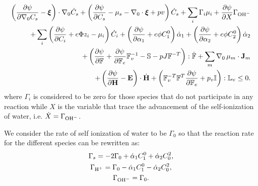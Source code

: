 \documentclass[12pt]{extarticle}
\newcommand{\F}{\ensuremath{\mathbb{F}}}
\begin{document}
\begin{equation*}
\begin{aligned}
\left(\frac{\partial \psi}{\partial \nabla_0 C_s}-\boldsymbol{\xi}\right) \cdot \nabla_0 \dot{C}_s + \left(\frac{\partial \psi}{\partial C_s}-\mu_s-\nabla_0 \cdot \boldsymbol{\xi}+p v\right)\dot{C}_s+ \sum_i \Gamma_i \mu_i + \frac{\partial \psi}{\partial X} \Gamma_{\ce{OH-}}\\
+ \sum_i\left(\frac{\partial \psi}{\partial C_i} + e\Phi z_i-\mu_i\right) \dot{C}_i + \left(\frac{\partial \psi}{\partial \alpha_1}+e\phi C^0_1\right)\dot{\alpha}_1 + \left(\frac{\partial \psi}{\partial \alpha_2}+e\phi C^0_2\right)\dot{\alpha}_2\\
+ \left(\frac{\partial \psi}{\partial \F} + \frac{\partial \psi}{\partial\F_e}\F_v^{-1}- \mathbb{S} - p J \F^{-T}\right): \dot{\F}+ \sum_m \nabla_0 \,\mu_m \cdot \mathbf{J}_m \\
+\left(\frac{\partial \psi}{\partial \mathbf{H}}-\mathbf{E}\right) \cdot \dot{\mathbf{H}}+ \left(\F_v^{-T}\F^T\frac{\partial \psi}{\partial \F_e}+p_v\mathbb{I}\right):\mathbb{L}_v\leq 0 . 
\end{aligned}
\end{equation*} 
where $\Gamma_i$ is considered to be zero for those species that do not participate in any reaction while $X$ is the variable that trace the advancement of the self-ionization of water, i.e. $\dot{X}=\Gamma_{\ce{OH-}}$.

We consider the rate of self ionization of water to be $\Gamma_0$ so that the reaction rate for the different species can be rewritten as:
\begin{gather}
\Gamma_{s}=-2\Gamma_0 + \dot{\alpha}_1 C^0_1 + \dot{\alpha}_2 C_0^2,\\
\Gamma_{\ce{H+}}= \Gamma_0 - \dot{\alpha}_1 C^0_1 - \dot{\alpha}_2 C_0^2,\\
\Gamma_{\ce{OH-}} = \Gamma_0.
\end{gather}
\end{document}
